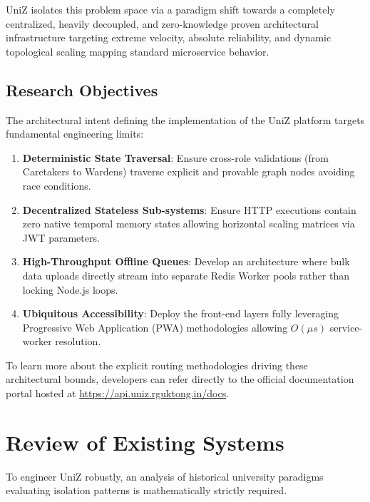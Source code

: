 \documentclass[journal,onecolumn,10pt,draftclsnofoot]{IEEEtran}
\begin{document}
UniZ isolates this problem space via a paradigm shift towards a completely centralized, heavily decoupled, and zero-knowledge proven architectural infrastructure targeting extreme velocity, absolute reliability, and dynamic topological scaling mapping standard microservice behavior.

\subsection{Research Objectives}
The architectural intent defining the implementation of the UniZ platform targets fundamental engineering limits:
\begin{enumerate}
    \item \textbf{Deterministic State Traversal}: Ensure cross-role validations (from Caretakers to Wardens) traverse explicit and provable graph nodes avoiding race conditions.
    \item \textbf{Decentralized Stateless Sub-systems}: Ensure HTTP executions contain zero native temporal memory states allowing horizontal scaling matrices via JWT parameters.
    \item \textbf{High-Throughput Offline Queues}: Develop an architecture where bulk data uploads directly stream into separate Redis Worker pools rather than locking Node.js loops.
    \item \textbf{Ubiquitous Accessibility}: Deploy the front-end layers fully leveraging Progressive Web Application (PWA) methodologies allowing $O(\mu s)$ service-worker resolution.
\end{enumerate}

To learn more about the explicit routing methodologies driving these architectural bounds, developers can refer directly to the official documentation portal hosted at \url{https://api.uniz.rguktong.in/docs}.

\newpage

\section{Review of Existing Systems}

To engineer UniZ robustly, an analysis of historical university paradigms evaluating isolation patterns is mathematically strictly required.
\end{document}
